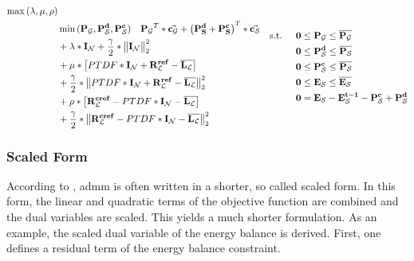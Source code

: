 \begin{subequations}
	\begin{align}
		\max{(\lambda, \mu, \rho)} \label{eq:opt_admm_matrix}\\
		 & \min{(\vb{P_\mathcal{G}}, \vb{P_\mathcal{S}^d}, \vb{P_\mathcal{S}^c})} \quad \vb{P_\mathcal{G}}^T * \va{c_\mathcal{G}} + \left(\vb{P_S^d} + \vb{P_S^c}\right)^T * \va{c_\mathcal{S}} \nonumber \\
		 & + \vb{\lambda} * \vb{I_\mathcal{N}} + \frac{\gamma}{2} * \big\|\vb{I_\mathcal{N}}\big\|_2^2 \nonumber \\
		 & + \vb{\mu} * \left[ PTDF * \vb{I_\mathcal{N}} + \vb{R_\mathcal{L}^{ref}} - \vb{\overline{L_\mathcal{L}}} \right] \nonumber \\
		 & + \frac{\gamma}{2} * \big\| PTDF * \vb{I_\mathcal{N}} + \vb{R_\mathcal{L}^{ref}} - \vb{\overline{L_\mathcal{L}}} \big\|_2^2 \nonumber \\
		 & + \vb{\rho} * \left[ \vb{R_\mathcal{L}^{cref}} - PTDF * \vb{I_\mathcal{N}} - \vb{\overline{L_\mathcal{L}}} \right] \nonumber \\
		 & + \frac{\gamma}{2} * \big\| \vb{R_\mathcal{L}^{cref}} - PTDF * \vb{I_\mathcal{N}} - \vb{\overline{L_\mathcal{L}}} \big\|_2^2 \nonumber
	\end{align}
		\begin{align}
		 \text{s.t. } \quad & \vb{0} \leq \vb{P_\mathcal{G}} \leq \vb{\overline{P_\mathcal{G}}} \\
		 & \vb{0} \leq \vb{P_\mathcal{S}^d} \leq \vb{\overline{P_\mathcal{S}}} \\
		 & \vb{0} \leq \vb{P_\mathcal{S}^c} \leq \vb{\overline{P_\mathcal{S}}} \\
		 & \vb{0} \leq \vb{E_\mathcal{S}} \leq \vb{\overline{E_\mathcal{S}}}\\
		 & \vb{0} = \vb{E_\mathcal{S}} - \vb{E_\mathcal{S}^{t-1}} - \vb{P_\mathcal{S}^c} + \vb{P_\mathcal{S}^d}
	\end{align}
\end{subequations}

\subsubsection{Scaled Form}

According to \citet{Boyd-2010-DistributedOptimizationStatistical}, \gls{admm} is often written in a shorter, so called scaled form. In this form, the linear and quadratic terms of the objective function are combined and the dual variables are scaled. This yields a much shorter formulation. As an example, the scaled dual variable of the energy balance is derived. First, one defines a residual term of the energy balance constraint.

